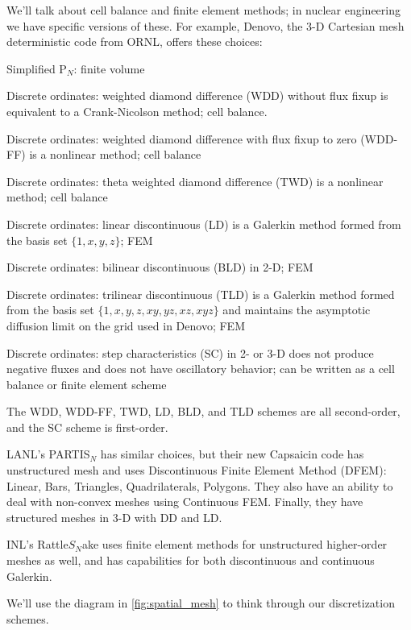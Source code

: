 \documentclass[12pt]{article}
\begin{document}
We'll talk about cell balance and finite element methods; in nuclear engineering we have specific versions of these. For example, Denovo, the 3-D Cartesian mesh deterministic code from ORNL, offers these choices:
\begin{compactitem}
\item Simplified P$_N$: finite volume 
\item Discrete ordinates: weighted diamond difference (WDD) without flux fixup is equivalent to a Crank-Nicolson method; cell balance.
\item Discrete ordinates: weighted diamond difference with flux fixup to zero (WDD-FF)  is a nonlinear method; cell balance 
\item Discrete ordinates: theta weighted diamond difference (TWD)  is a nonlinear method; cell balance
\item Discrete ordinates: linear discontinuous (LD) is a Galerkin method formed from the basis set $\{1,x,y,z\}$; FEM 
\item Discrete ordinates: bilinear discontinuous (BLD) in 2-D; FEM
\item Discrete ordinates: trilinear discontinuous (TLD) is a Galerkin method formed from the basis set $\{1,x,y,z,xy,yz,xz,xyz\}$ and maintains the asymptotic diffusion limit on the grid used in Denovo; FEM
\item Discrete ordinates: step characteristics (SC) in 2- or 3-D does not produce negative fluxes and does not have oscillatory behavior; can be written as a cell balance or finite element scheme
\end{compactitem}
The WDD, WDD-FF, TWD, LD, BLD, and TLD schemes are all second-order, and the SC scheme is first-order.  

\hrulefill

LANL's PARTIS$_N$ has similar choices, but their new Capsaicin code has unstructured mesh and uses Discontinuous Finite Element Method (DFEM): Linear, Bars, Triangles, Quadrilaterals, Polygons. They also have an ability to deal with non-convex meshes using Continuous FEM. Finally, they have structured meshes in 3-D with DD and LD.

INL's Rattle$S_N$ake uses finite element methods for unstructured higher-order
meshes as well, and has capabilities for both discontinuous and continuous Galerkin.

We'll use the diagram in \ref{fig:spatial_mesh} to think through our discretization schemes.
\end{document}
